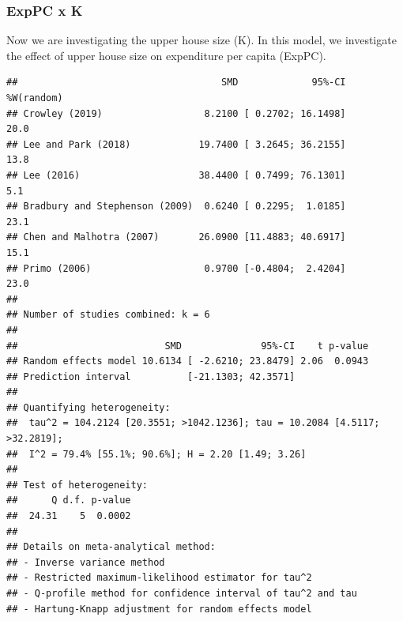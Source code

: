 \documentclass[
]{article}
\newenvironment{Shaded}{\begin{snugshade}}{\end{snugshade}}
\newcommand{\CommentTok}[1]{\textcolor[rgb]{0.56,0.35,0.01}{\textit{#1}}}
\newcommand{\DataTypeTok}[1]{\textcolor[rgb]{0.13,0.29,0.53}{#1}}
\newcommand{\KeywordTok}[1]{\textcolor[rgb]{0.13,0.29,0.53}{\textbf{#1}}}
\newcommand{\NormalTok}[1]{#1}
\newcommand{\OperatorTok}[1]{\textcolor[rgb]{0.81,0.36,0.00}{\textbf{#1}}}
\newcommand{\OtherTok}[1]{\textcolor[rgb]{0.56,0.35,0.01}{#1}}
\newcommand{\StringTok}[1]{\textcolor[rgb]{0.31,0.60,0.02}{#1}}
\begin{document}
\newpage

\hypertarget{exppc-x-k}{%
\subsubsection{ExpPC x K}\label{exppc-x-k}}

Now we are investigating the upper house size (K). In this model, we
investigate the effect of upper house size on expenditure per capita
(ExpPC).

\begin{Shaded}
\end{Shaded}

\begin{verbatim}
##                                    SMD             95%-CI %W(random)
## Crowley (2019)                  8.2100 [ 0.2702; 16.1498]       20.0
## Lee and Park (2018)            19.7400 [ 3.2645; 36.2155]       13.8
## Lee (2016)                     38.4400 [ 0.7499; 76.1301]        5.1
## Bradbury and Stephenson (2009)  0.6240 [ 0.2295;  1.0185]       23.1
## Chen and Malhotra (2007)       26.0900 [11.4883; 40.6917]       15.1
## Primo (2006)                    0.9700 [-0.4804;  2.4204]       23.0
## 
## Number of studies combined: k = 6
## 
##                          SMD              95%-CI    t p-value
## Random effects model 10.6134 [ -2.6210; 23.8479] 2.06  0.0943
## Prediction interval          [-21.1303; 42.3571]             
## 
## Quantifying heterogeneity:
##  tau^2 = 104.2124 [20.3551; >1042.1236]; tau = 10.2084 [4.5117; >32.2819];
##  I^2 = 79.4% [55.1%; 90.6%]; H = 2.20 [1.49; 3.26]
## 
## Test of heterogeneity:
##      Q d.f. p-value
##  24.31    5  0.0002
## 
## Details on meta-analytical method:
## - Inverse variance method
## - Restricted maximum-likelihood estimator for tau^2
## - Q-profile method for confidence interval of tau^2 and tau
## - Hartung-Knapp adjustment for random effects model
\end{verbatim}
\end{document}
